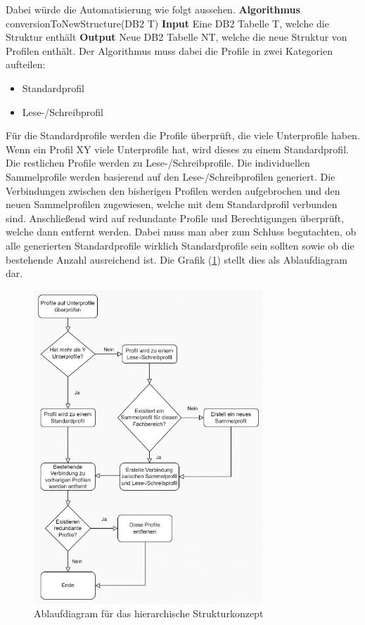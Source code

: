 Dabei würde die Automatisierung wie folgt aussehen.
\newline
\newline
\textbf{Algorithmus} conversionToNewStructure(DB$2$ T)
\newline
\newline
\textbf{Input} Eine DB2 Tabelle T, welche die Struktur enthält
\newline
\newline
\textbf{Output} Neue DB2 Tabelle NT, welche die neue Struktur von Profilen enthält.
\newline
\newline
Der Algorithmus muss dabei die Profile in zwei Kategorien aufteilen:
\begin{itemize}
	\item Standardprofil
	\item Lese-/Schreibprofil
\end{itemize}
Für die Standardprofile werden die Profile überprüft, die viele Unterprofile haben.
Wenn ein Profil XY viele Unterprofile hat, wird dieses zu einem Standardprofil.
Die restlichen Profile werden zu Lese-/Schreibprofile.
Die individuellen Sammelprofile werden basierend auf den Lese-/Schreibprofilen generiert.
Die Verbindungen zwischen den bisherigen Profilen werden aufgebrochen und den neuen Sammelprofilen zugewiesen, welche mit dem Standardprofil verbunden sind.
Anschließend wird auf redundante Profile und Berechtigungen überprüft, welche dann entfernt werden.
Dabei muss man aber zum Schluss begutachten, ob alle generierten Standardprofile wirklich Standardprofile sein sollten sowie ob die bestehende Anzahl ausreichend ist.
Die Grafik (\ref{fig:Hier}) stellt dies als Ablaufdiagram dar.
\begin{figure}[h!]
 \centering
 \includegraphics[width=0.77\textwidth]{gfx/Picture/Hier.PNG}
 \caption{Ablaufdiagram für das hierarchische Strukturkonzept}
 \label{fig:Hier}
\end{figure}
\newpage

